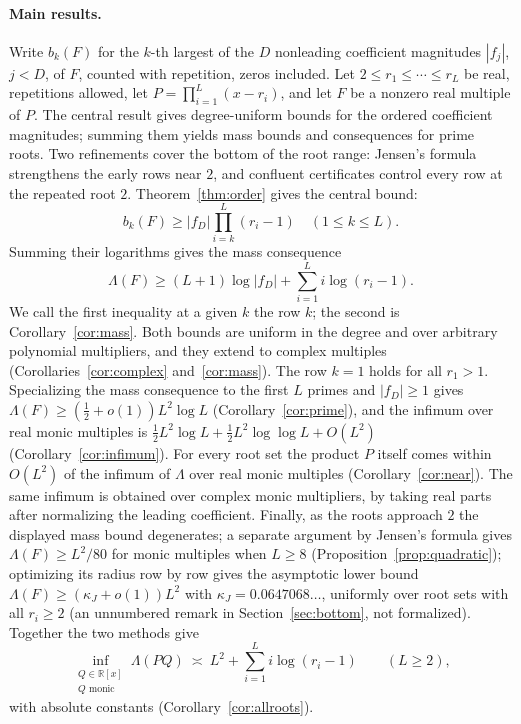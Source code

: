 \documentclass[11pt]{article}
\newcommand{\R}{\mathbb R}
\begin{document}
\paragraph{Main results.}
Write $b_k(F)$ for the $k$-th largest of the $D$ nonleading coefficient
magnitudes $|f_j|$, $j<D$, of $F$, counted with repetition, zeros included.
Let $2\le r_1\le\cdots\le r_L$ be real, repetitions allowed, let
$P=\prod_{i=1}^L(x-r_i)$, and let $F$ be a nonzero real multiple of $P$.
The central result gives degree-uniform bounds for the ordered coefficient
magnitudes; summing them yields mass bounds and consequences for prime roots.
Two refinements cover
the bottom of the root range: Jensen's formula strengthens the early rows
near $2$, and confluent certificates control every row at the repeated root
$2$.  Theorem~\ref{thm:order} gives the central bound:
\[
  b_k(F)\ge|f_D|\prod_{i=k}^{L}(r_i-1)
  \quad(1\le k\le L).
\]
Summing their logarithms gives the mass consequence
\[
  \Lambda(F)\ge(L+1)\log|f_D|+\sum_{i=1}^{L}i\log(r_i-1).
\]
We call the first inequality at a given $k$ the row $k$; the second is
Corollary~\ref{cor:mass}.  Both bounds are
uniform in the degree and over arbitrary polynomial multipliers, and they
extend to complex multiples (Corollaries~\ref{cor:complex} and~\ref{cor:mass}).  The row $k=1$
holds for all $r_1>1$.  Specializing the mass consequence to the
first $L$ primes and $|f_D|\ge1$ gives
$\Lambda(F)\ge(\frac12+o(1))L^2\log L$ (Corollary~\ref{cor:prime}), and the
infimum over real monic multiples is
$\frac12L^2\log L+\frac12L^2\log\log L+O(L^2)$ (Corollary~\ref{cor:infimum}).
For every root set the product $P$ itself comes within $O(L^2)$ of the
infimum of $\Lambda$ over real monic multiples (Corollary~\ref{cor:near}).
The same infimum is obtained over complex monic multipliers, by taking real
parts after normalizing the leading coefficient.  Finally, as
the roots approach $2$ the displayed mass bound degenerates; a separate argument by
Jensen's formula gives $\Lambda(F)\ge L^2/80$ for monic multiples when
$L\ge8$ (Proposition~\ref{prop:quadratic}); optimizing its radius row by
row gives the asymptotic lower bound $\Lambda(F)\ge(\kappa_J+o(1))L^2$ with
$\kappa_J=0.0647068\ldots$, uniformly over root sets with all $r_i\ge2$ (an
unnumbered remark in Section~\ref{sec:bottom}, not formalized).  Together the two methods give
\[
  \inf_{\substack{Q\in\R[x]\\Q\text{ monic}}}\Lambda(PQ)
  \ \asymp\ L^2+\sum_{i=1}^Li\log(r_i-1)
  \qquad(L\ge2),
\]
with absolute constants (Corollary~\ref{cor:allroots}).
\end{document}
